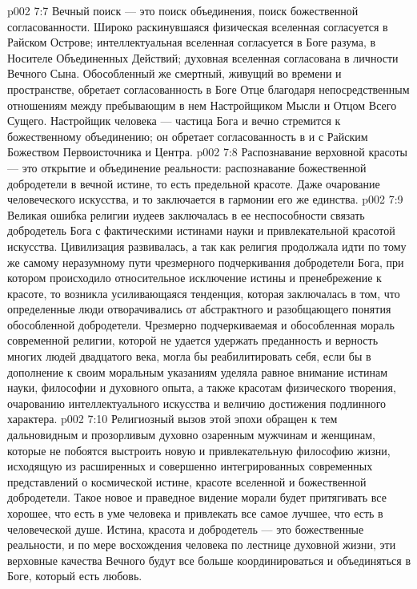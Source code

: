 \vs p002 7:7 \pc Вечный поиск --- это поиск объединения, поиск божественной согласованности. Широко раскинувшаяся физическая вселенная согласуется в Райском Острове; интеллектуальная вселенная согласуется в Боге разума, в Носителе Объединенных Действий; духовная вселенная согласована в личности Вечного Сына. Обособленный же смертный, живущий во времени и пространстве, обретает согласованность в Боге Отце благодаря непосредственным отношениям между пребывающим в нем Настройщиком Мысли и Отцом Всего Сущего. Настройщик человека --- частица Бога и вечно стремится к божественному объединению; он обретает согласованность в и с Райским Божеством Первоисточника и Центра.
\vs p002 7:8 \pc Распознавание верховной красоты --- это открытие и объединение реальности: распознавание божественной добродетели в вечной истине, то есть предельной красоте. Даже очарование человеческого искусства, и то заключается в гармонии его же единства.
\vs p002 7:9 Великая ошибка религии иудеев заключалась в ее неспособности связать добродетель Бога с фактическими истинами науки и привлекательной красотой искусства. Цивилизация развивалась, а так как религия продолжала идти по тому же самому неразумному пути чрезмерного подчеркивания добродетели Бога, при котором происходило относительное исключение истины и пренебрежение к красоте, то возникла усиливающаяся тенденция, которая заключалась в том, что определенные люди отворачивались от абстрактного и разобщающего понятия обособленной добродетели. Чрезмерно подчеркиваемая и обособленная мораль современной религии, которой не удается удержать преданность и верность многих людей двадцатого века, могла бы реабилитировать себя, если бы в дополнение к своим моральным указаниям уделяла равное внимание истинам науки, философии и духовного опыта, а также красотам физического творения, очарованию интеллектуального искусства и величию достижения подлинного характера.
\vs p002 7:10 Религиозный вызов этой эпохи обращен к тем дальновидным и прозорливым духовно озаренным мужчинам и женщинам, которые не побоятся выстроить новую и привлекательную философию жизни, исходящую из расширенных и совершенно интегрированных современных представлений о космической истине, красоте вселенной и божественной добродетели. Такое новое и праведное видение морали будет притягивать все хорошее, что есть в уме человека и привлекать все самое лучшее, что есть в человеческой душе. Истина, красота и добродетель --- это божественные реальности, и по мере восхождения человека по лестнице духовной жизни, эти верховные качества Вечного будут все больше координироваться и объединяться в Боге, который есть любовь.
